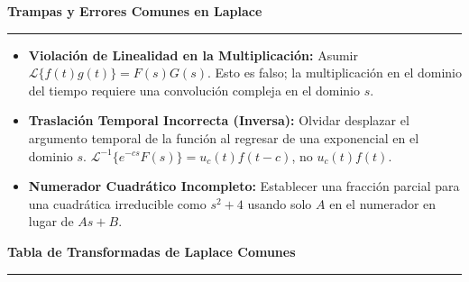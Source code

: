\documentclass[10pt, landscape, twocolumn]{article}
\newcommand{\cheatsheetsection}[1]{
    \vspace{0.6em}
    {\color{themeblue}\large\bfseries #1} \par
    \vspace{-0.5em}
    {\color{themeblue}\rule{\linewidth}{1pt}} \par
    \vspace{0.2em}
}
\begin{document}
\cheatsheetsection{Trampas y Errores Comunes en Laplace}
\begin{itemize}[leftmargin=*, nosep]
    \item \textbf{Violación de Linealidad en la Multiplicación:} Asumir $\mathcal{L}\{f(t)g(t)\} = F(s)G(s)$. Esto es falso; la multiplicación en el dominio del tiempo requiere una convolución compleja en el dominio $s$.
    \item \textbf{Traslación Temporal Incorrecta (Inversa):} Olvidar desplazar el argumento temporal de la función al regresar de una exponencial en el dominio $s$. $\mathcal{L}^{-1}\{e^{-cs}F(s)\} = u_c(t)f(t-c)$, no $u_c(t)f(t)$.
    \item \textbf{Numerador Cuadrático Incompleto:} Establecer una fracción parcial para una cuadrática irreducible como $s^2+4$ usando solo $A$ en el numerador en lugar de $As+B$.
\end{itemize}

\clearpage 

\begingroup
\large
\renewcommand{\arraystretch}{1.4}

\cheatsheetsection{Tabla de Transformadas de Laplace Comunes}
\vspace{0.5em}
\end{document}

